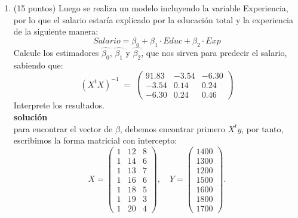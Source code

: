 \documentclass[10pt,a4paper]{article}
\begin{document}
\begin{enumerate}
\begin{enumerate}
    \item (15 puntos) Luego se realiza un modelo incluyendo la variable Experiencia, por lo que el salario estaría explicado por la educación total y la experiencia de la siguiente manera:
    $$Salario = \beta_0 + \beta_1 \cdot Educ + \beta_2 \cdot Exp$$
    Calcule los estimadores $\hat{\beta_0}$, $\hat{\beta_1}$ y $\hat{\beta_2}$, que nos sirven para predecir el salario, sabiendo que:
    \[
(X^tX)^{-1} \;=\;
\begin{pmatrix}
91.83 & -3.54 & -6.30 \\
-3.54 & 0.14 & 0.24 \\
-6.30 & 0.24 & 0.46
\end{pmatrix}
\]
Interprete los resultados.
    \\
    \textbf{solución}
    \\
 para encontrar el vector de $\beta$, debemos encontrar primero $X^ty$, por tanto, escribimos la forma matricial con intercepto:
\[
X=
\begin{pmatrix}
1 & 12 & 8\\
1 & 14 & 6\\
1 & 13 & 7\\
1 & 16 & 6\\
1 & 18 & 5\\
1 & 19 & 3\\
1 & 20 & 4
\end{pmatrix},\quad
Y=
\begin{pmatrix}
1400\\ 1300\\ 1200\\ 1500\\ 1600\\ 1800\\ 1700
\end{pmatrix}.
\]


\end{enumerate}
\end{enumerate}
\end{document}
